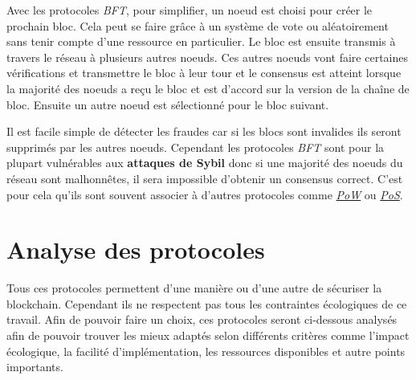 \documentclass[../tb_report.tex]{subfiles}
\begin{document}
Avec les protocoles \textit{BFT}, pour simplifier, un noeud est choisi pour créer le prochain bloc. Cela peut se faire grâce à un système de vote ou aléatoirement sans tenir compte d'une ressource en particulier. Le bloc est ensuite transmis à travers le réseau à plusieurs autres noeuds. Ces autres noeuds vont faire certaines vérifications et transmettre le bloc à leur tour et le consensus est atteint lorsque la majorité des noeuds a reçu le bloc et est d'accord sur la version de la chaîne de bloc. Ensuite un autre noeud est sélectionné pour le bloc suivant.

Il est facile simple de détecter les fraudes car si les blocs sont invalides ils seront supprimés par les autres noeuds. Cependant les protocoles \textit{BFT} sont pour la plupart vulnérables aux \textbf{attaques de Sybil} donc si une majorité des noeuds du réseau sont malhonnêtes, il sera impossible d'obtenir un consensus correct. C'est pour cela qu'ils sont souvent associer à d'autres protocoles comme \hyperref[consensus:pow]{\textit{PoW}} ou \hyperref[consensus:pos]{\textit{PoS}}.

\section{Analyse des protocoles}

Tous ces protocoles permettent d'une manière ou d'une autre de sécuriser la blockchain. Cependant ils ne respectent pas tous les contraintes écologiques de ce travail. Afin de pouvoir faire un choix, ces protocoles seront ci-dessous analysés afin de pouvoir trouver les mieux adaptés selon différents critères comme l'impact écologique, la facilité d'implémentation, les ressources disponibles et autre points importants.
\end{document}
